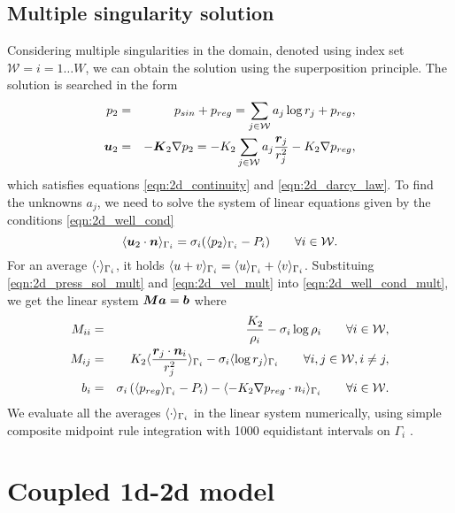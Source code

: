   \subsection{Multiple singularity solution}
  Considering multiple singularities in the domain, denoted using index set $\mathcal{W}=i=1\ldots W$, we can obtain the solution using the superposition principle.
  The solution is searched in the form
  \begin{eqnarray}
    p_2 &=& p_{sin} + p_{reg} = \sum\limits_{j\in\mathcal{W}} a_j\log r_j + p_{reg}, \label{eqn:2d_press_sol_mult}\\
    \mathbf{\boldsymbol{u}}_2 &=& -\mathbf{\boldsymbol{K}}_2\nabla p_2 = -K_2 \sum\limits_{j\in\mathcal{W}} a_j\frac{\mathbf{\boldsymbol{r}}_j}{r_j^2} - K_2 \nabla p_{reg}, \label{eqn:2d_vel_mult}
  \end{eqnarray}
  which satisfies equations \eqref{eqn:2d_continuity} and \eqref{eqn:2d_darcy_law}.
  To find the unknowns $a_j$, we need to solve the system of linear equations given by the conditions \eqref{eqn:2d_well_cond}
  \begin{equation}
    \langle\mathbf{\boldsymbol{u}}_2 \cdot \mathbf{\boldsymbol{n}}\rangle_{\Gamma_i} = \sigma_i (\langle p_2\rangle_{\Gamma_i} - P_i) \qquad  \forall i\in\mathcal{W}. \label{eqn:2d_well_cond_mult}
  \end{equation}
  For an average $\langle\cdot\rangle_{\Gamma_i}$, it holds $\langle u+v\rangle_{\Gamma_i} = \langle u\rangle_{\Gamma_i} + \langle v\rangle_{\Gamma_i}$.
  Substituing \eqref{eqn:2d_press_sol_mult} and \eqref{eqn:2d_vel_mult} into \eqref{eqn:2d_well_cond_mult}, we get
  the linear system $\mathbf{\boldsymbol{M}}\mathbf{\boldsymbol{a}} = \mathbf{\boldsymbol{b}}$ where
  \begin{eqnarray}
    M_{ii} &=& \frac{K_2}{\rho_i} - \sigma_i\log\rho_i \qquad \forall i\in\mathcal{W},\\
    M_{ij} &=& K_2\langle\frac{\mathbf{\boldsymbol{r}}_j \cdot \mathbf{\boldsymbol{n}}_i}{r_j^2}\rangle_{\Gamma_i} - \sigma_i\langle\log r_j\rangle_{\Gamma_i} \qquad \forall i,j\in\mathcal{W}, i\neq j,\\
    b_{i} &=& \sigma_i\left(\langle p_{reg}\rangle_{\Gamma_i} - P_i \right) - \langle- K_2 \nabla p_{reg}\cdot n_i\rangle_{\Gamma_i} \qquad \forall i\in\mathcal{W}.
  \end{eqnarray}
  We evaluate all the averages $\langle\cdot\rangle_{\Gamma_i}$ in the linear system numerically,
  using simple composite midpoint rule integration with 1000 equidistant intervals on $\Gamma_i$ .
  
\section{Coupled 1d-2d model}

